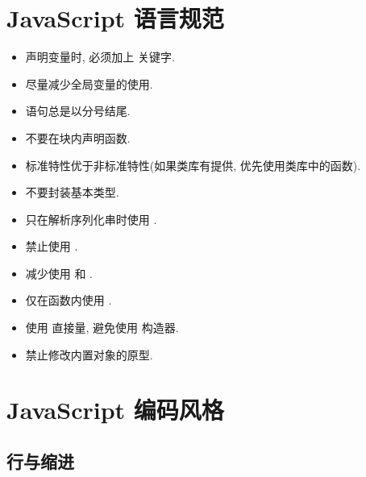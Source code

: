 \documentclass[letterpaper,10pt,english]{sphinxmanual}
\begin{document}
\section{JavaScript 语言规范}
\label{styleguide/js-lang-rules:styleguide-jslangrules}\label{styleguide/js-lang-rules:javascript}\label{styleguide/js-lang-rules::doc}\begin{itemize}
\item {}
声明变量时, 必须加上  关键字.

\item {}
尽量减少全局变量的使用.

\item {}
语句总是以分号结尾.

\item {}
不要在块内声明函数.

\item {}
标准特性优于非标准特性(如果类库有提供, 优先使用类库中的函数).

\item {}
不要封装基本类型.

\item {}
只在解析序列化串时使用  .

\item {}
禁止使用  .

\item {}
减少使用  和  .

\item {}
仅在函数内使用  .

\item {}
使用  直接量, 避免使用  构造器.

\item {}
禁止修改内置对象的原型.

\end{itemize}


\section{JavaScript 编码风格}
\label{styleguide/js-style-rules:styleguide-jsstylerules}\label{styleguide/js-style-rules:javascript}\label{styleguide/js-style-rules::doc}

\subsection{行与缩进}
\label{styleguide/js-style-rules:id1}
\end{document}
